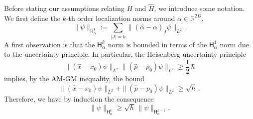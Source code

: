 \documentclass[11pt]{amsart}
\def\Sobolev{{\mathsf{H}}}
\def\Real{{\mathbb R}}
\numberwithin{equation}{section}
\begin{document}
Before stating our assumptions relating
$H$ and $\hat{H}$, we introduce some notation.  We first define the $k$-th order localization norms
around $\alpha\in\Real^{2D}$,
\[
\|\psi\|_{\Sobolev^k_\alpha} := \sum_{|J|=k} \|(\hat{\alpha}-\alpha)_J \psi\|_{L^2}.
\]
A first observation is that the $\Sobolev^k_\alpha$ norm is bounded in terms of the $\Sobolev^1_\alpha$ norm due to the uncertainty
principle.  In particular, the Heisenberg uncertainty principle
\[
\|(\hat{x}-x_0)\psi\|_{L^2}\|(\hat{p}-p_0)\psi\|_{L^2}  \geq \frac12 \,\hbar
\]
implies, by the AM-GM inequality, the bound
\[
\|(\hat{x}-x_0)\psi\|_{L^2} + \|(\hat{p}-p_0)\psi\|_{L^2} \geq \sqrt{\hbar}\,.
\]
Therefore, we have by induction the consequence
\begin{equation}
\label{eq:Hk-lb}
\|\psi\|_{\Sobolev^k_\alpha} \geq \sqrt{\hbar}\, \|\psi\|_{\Sobolev^{k-1}_\alpha}.
\end{equation}
\end{document}

